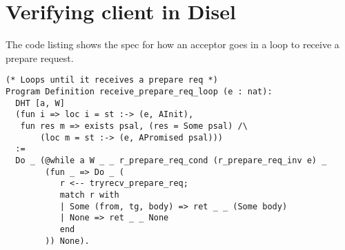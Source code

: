 \section{Verifying client in Disel}
The code listing shows the spec for how an acceptor goes in a loop
to receive a prepare request.
\begin{lstlisting}
(* Loops until it receives a prepare req *)
Program Definition receive_prepare_req_loop (e : nat):
  DHT [a, W]
  (fun i => loc i = st :-> (e, AInit),
   fun res m => exists psal, (res = Some psal) /\
       (loc m = st :-> (e, APromised psal)))
  :=
  Do _ (@while a W _ _ r_prepare_req_cond (r_prepare_req_inv e) _
        (fun _ => Do _ (
           r <-- tryrecv_prepare_req;
           match r with
           | Some (from, tg, body) => ret _ _ (Some body)
           | None => ret _ _ None
           end
        )) None).
\end{lstlisting}

